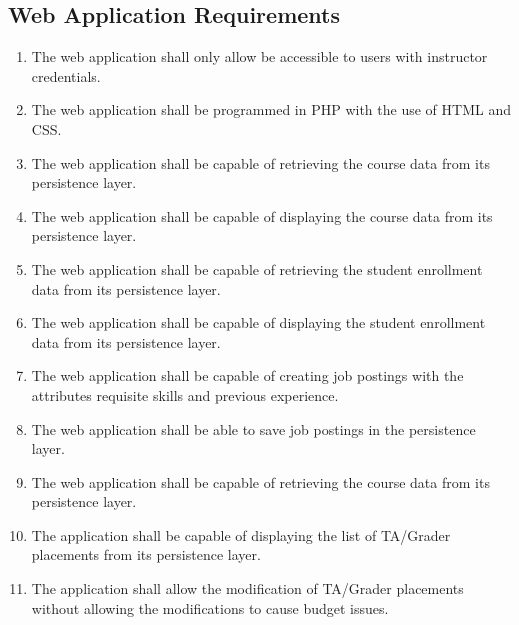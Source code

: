 \documentclass[12pt]{report}
\begin{document}
\subsection{Web Application Requirements}
\begin{enumerate}[\thesubsection .1]
	\item The web application shall only allow be accessible to users with instructor credentials.
	\item The web application shall be programmed in PHP with the use of HTML and CSS.
	\item The web application shall be capable of retrieving the course data from its persistence layer.
	\item The web application shall be capable of displaying the course data from its persistence layer.
	\item The web application shall be capable of retrieving the student enrollment data from its persistence layer.
	\item The web application shall be capable of displaying the student enrollment data from its persistence layer.
	\item The web application shall be capable of creating job postings with the attributes requisite skills and previous experience.
	\item The web application shall be able to save job postings in the persistence layer.
	\item The web application shall be capable of retrieving the course data from its persistence layer.
	\item The application shall be capable of displaying the list of TA/Grader placements from its persistence layer.
	\item The application shall allow the modification of TA/Grader placements without allowing the modifications to cause budget issues.
\end{enumerate}
\end{document}
